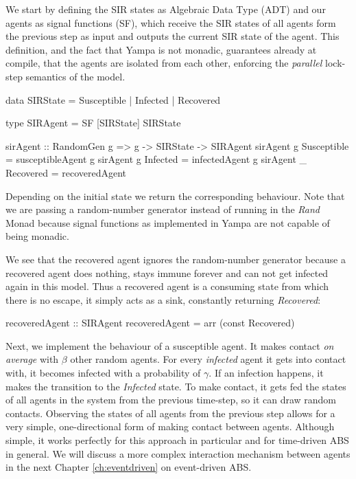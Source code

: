 We start by defining the SIR states as Algebraic Data Type (ADT) and our agents as signal functions (SF), which receive the SIR states of all agents form the previous step as input and outputs the current SIR state of the agent. This definition, and the fact that Yampa is not monadic, guarantees already at compile, that the agents are isolated from each other, enforcing the \textit{parallel} lock-step semantics of the model.

\begin{HaskellCode}
data SIRState = Susceptible | Infected | Recovered

type SIRAgent = SF [SIRState] SIRState 

sirAgent :: RandomGen g => g -> SIRState -> SIRAgent
sirAgent g Susceptible = susceptibleAgent g
sirAgent g Infected    = infectedAgent g
sirAgent _ Recovered   = recoveredAgent
\end{HaskellCode}

Depending on the initial state we return the corresponding behaviour. Note that we are passing a random-number generator instead of running in the \textit{Rand} Monad because signal functions as implemented in Yampa are not capable of being monadic. 

We see that the recovered agent ignores the random-number generator because a recovered agent does nothing, stays immune forever and can not get infected again in this model. Thus a recovered agent is a consuming state from which there is no escape, it simply acts as a sink, constantly returning \textit{Recovered}:

\begin{HaskellCode}
recoveredAgent :: SIRAgent
recoveredAgent = arr (const Recovered)
\end{HaskellCode}

Next, we implement the behaviour of a susceptible agent. It makes contact \textit{on average} with $\beta$ other random agents. For every \textit{infected} agent it gets into contact with, it becomes infected with a probability of $\gamma$. If an infection happens, it makes the transition to the \textit{Infected} state. To make contact, it gets fed the states of all agents in the system from the previous time-step, so it can draw random contacts. Observing the states of all agents from the previous step allows for a very simple, one-directional form of making contact between agents. Although simple, it works perfectly for this approach in particular and for time-driven ABS in general. We will discuss a more complex interaction mechanism between agents in the next Chapter \ref{ch:eventdriven} on event-driven ABS.

